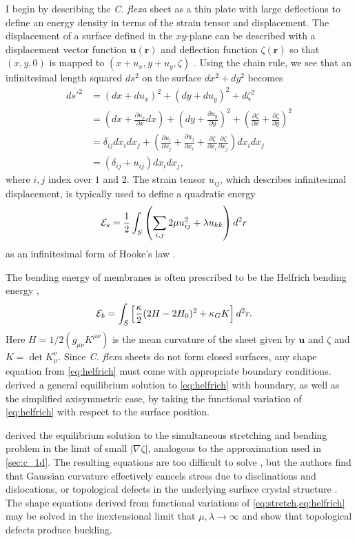 I begin by describing the \textit{C. flexa} sheet as a thin plate with large deflections to define an energy density in terms of the strain tensor and displacement.
The displacement of a surface defined in the $xy$-plane can be described with a displacement vector function $\bm{u}(\bm{r})$ and deflection function $\zeta(\bm{r})$ so that $(x, y, 0)$ is mapped to $(x + u_x, y + u_y, \zeta)$ \citep{landau1986}.
Using the chain rule, we see that an infinitesimal length squared $ds^2$ on the surface $dx^2 + dy^2$ becomes 
\begin{align*}
	d{s'}^2 &= (dx + du_x)^2 + (dy + du_y)^2 + d\zeta^2 \\
	&= \left(dx + \frac{\partial u_x}{\partial x} dx\right)+ \left(dy + \frac{\partial u_y}{\partial y} \right)^2 + \left(\frac{\partial\zeta}{\partial x} + \frac{\partial\zeta}{\partial y} \right)^2 \\
	&= \delta_{ij} dx_i dx_j + \left(\frac{\partial u_i}{\partial x_j} + \frac{\partial u_j}{\partial x_i} + \frac{\partial \zeta}{\partial x_i} \frac{\partial \zeta}{\partial x_j}\right) dx_i dx_j \\
	&= (\delta_{ij} + u_{ij}) dx_i dx_j,
\end{align*}
where $i,j$ index over $1$ and $2$. The strain tensor $u_{ij}$, which describes infinitesimal displacement, is typically used to define a quadratic energy 
\begin{align}
	\mathcal{E}_s &= \frac{1}{2} \int_S \left( \sum_{i,j}2\mu u_{ij}^2 + \lambda u_{kk} \right) d^2r \label{eq:stretch}
\end{align}
as an infinitesimal form of Hooke's law \citep{landau1986}. 

The bending energy of membranes is often prescribed to be the Helfrich bending energy \citep{helfrich1973},
\begin{align}
	\mathcal{E}_b &= \int_S \left[ \frac{\kappa}{2} (2H - 2H_0)^2 + \kappa_G K \right] d^2r. \label{eq:helfrich}	
\end{align}
\noindent Here $H=1/2 (g_{\mu\nu}K^{\mu\nu})$ is the mean curvature of the sheet given by $\bm{u}$ and $\zeta$ and $K = \det K_\mu^\nu$. 
Since \textit{C. flexa} sheets do not form closed surfaces, any shape equation from \cref{eq:helfrich} must come with appropriate boundary conditions. 
\citet{tu2003} derived a general equilibrium solution to \cref{eq:helfrich} with boundary, as well as the simplified axisymmetric case, by taking the functional variation of \cref{eq:helfrich} with respect to the surface position.

\citet{seung1988} derived the equilibrium solution to the simultaneous stretching and bending problem in the limit of small $|\nabla \zeta|$, analogous to the approximation used in \cref{sec:c_1d}.
The resulting equations are too difficult to solve \citep{landau1986}, but the authors find that Gaussian curvature effectively cancels stress due to disclinations and dislocations, or topological defects in the underlying surface crystal structure \citep{sachdev1984}.
The shape equations derived from functional variations of \cref{eq:stretch,eq:helfrich} may be solved in the inextensional limit that $\mu,\lambda \to\infty$ and show that topological defects produce buckling.

